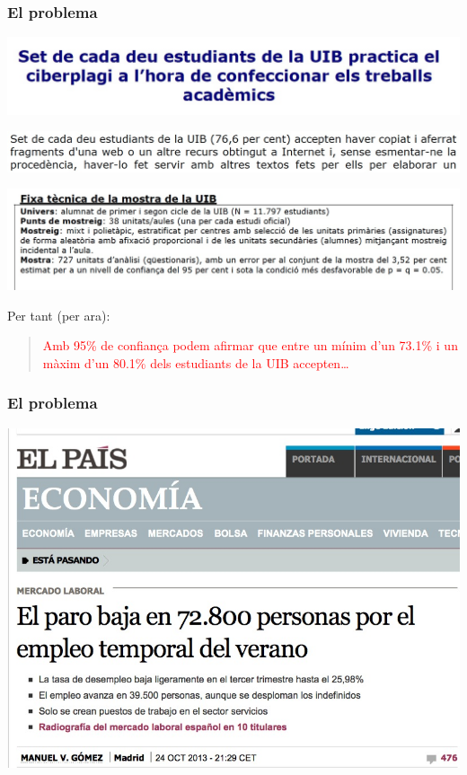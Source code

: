 \documentclass[12pt,t]{beamer}
\newcommand{\red}[1]{\textcolor{red}{#1}}
\theoremstyle{plain}
\theoremstyle{definition}
\begin{document}
\begin{frame}
\frametitle{El problema}
\vspace*{-1cm}

\begin{center}
\hspace*{-0.5cm}
\includegraphics[width=1.1\linewidth]{plagiUIB1.jpg}\medskip

\hspace*{-0.4cm}
\includegraphics[width=1.05\linewidth]{plagiUIB3.jpg}\medskip

\hspace*{-0.5cm}\includegraphics[width=1.1\linewidth]{plagiUIB2.jpg}
\end{center}
\vspace*{-1ex}

Per tant (per ara):
\begin{quote}
\red{Amb 95\% de confiança podem afirmar que entre un mínim d'un 73.1\% i un màxim d'un 80.1\% dels estudiants de la UIB
accepten\ldots}
\end{quote}
\end{frame}


\begin{frame}
\frametitle{El problema}
\vspace*{-0.5cm}

\begin{center}
\includegraphics[width=1\linewidth]{EPA3}
\end{center}
\end{frame}
\end{document}
